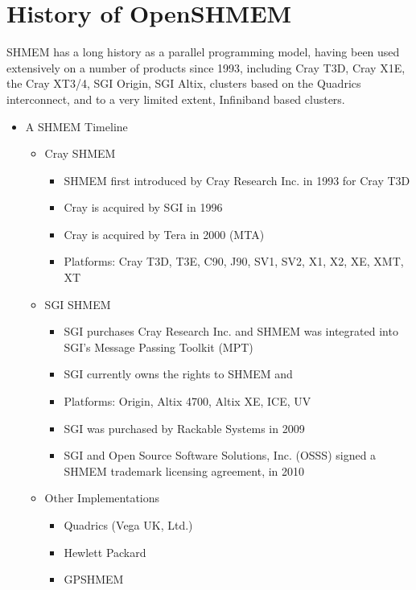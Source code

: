 \clearpage







\chapter{History of OpenSHMEM}\label{sec:openshmem_history}

SHMEM has a long history as a parallel programming model, having been used
extensively on a number of products since 1993, including Cray T3D, Cray X1E,
the Cray XT3/4, SGI Origin, SGI Altix, clusters based on the Quadrics
interconnect, and to a very limited extent, Infiniband based clusters.

\begin{itemize}
\item A SHMEM Timeline
  \begin{itemize}
  \item Cray SHMEM
    \begin{itemize}
    \item SHMEM first introduced by Cray Research Inc. in 1993 for Cray T3D
    \item Cray is acquired by SGI in 1996
    \item Cray is acquired by Tera in 2000 (MTA)
    \item Platforms: Cray T3D, T3E, C90, J90, SV1, SV2, X1, X2, XE, XMT, XT
    \end{itemize}
  \item SGI SHMEM
    \begin{itemize}
    \item SGI purchases  Cray Research Inc. and SHMEM was integrated into
      SGI's Message Passing Toolkit (MPT)
    \item SGI currently owns the rights to SHMEM and \openshmem
    \item Platforms: Origin, Altix 4700, Altix XE, ICE, UV
    \item SGI was purchased by Rackable Systems in 2009
    \item SGI and Open Source Software Solutions, Inc. (OSSS) signed a
      SHMEM trademark licensing agreement, in 2010
    \end{itemize}
  \item Other Implementations
    \begin{itemize}
    \item Quadrics (Vega UK, Ltd.)
    \item Hewlett Packard
    \item GPSHMEM

\end{itemize}
\end{itemize}
\end{itemize}

